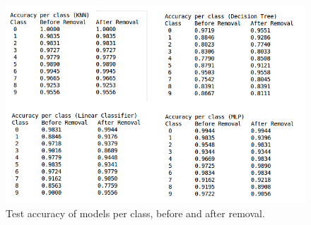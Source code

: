 \documentclass[12pt]{article}
\begin{document}
\begin{figure}[ht] 
	\begin{center}
		\includegraphics[width=6in]{acc.png}
		\caption{Test accuracy of models per class, before and after removal.}
		\label{fig:acc}
	\end{center}
\end{figure} 
\end{document}

